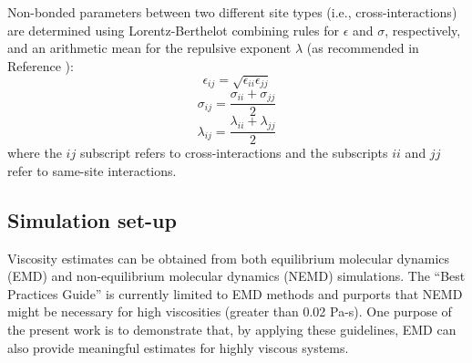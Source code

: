 \documentclass[preprint,review,12pt]{elsarticle}
\begin{document}
	Non-bonded parameters between two different site types (i.e., cross-interactions) are determined using Lorentz-Berthelot combining rules \cite{Allen1987} for $\epsilon$ and $\sigma$, respectively, and an arithmetic mean for the repulsive exponent $\lambda$ (as recommended in Reference ):
	\begin{equation} \label{eq:Lorentz-Berthelot_eps}
	\epsilon_{ij} = \sqrt{\epsilon_{ii} \epsilon_{jj}}
	\end{equation}
	\begin{equation} \label{eq:Lorentz-Berthelot_sig}
	\sigma_{ij} = \frac{\sigma_{ii} + \sigma_{jj}}{2}
	\end{equation}
	\begin{equation} \label{eq:Lorentz-Berthelot_lam}
	\lambda_{ij} = \frac{\lambda_{ii} + \lambda_{jj}}{2}
	\end{equation}
	where the $ij$ subscript refers to cross-interactions and the subscripts $ii$ and $jj$ refer to same-site interactions. 
	
	
	\subsection{Simulation set-up}
	
	
	Viscosity estimates can be obtained from both equilibrium molecular dynamics (EMD) and non-equilibrium molecular dynamics (NEMD) simulations. The ``Best Practices Guide'' is currently limited to EMD methods and purports that NEMD might be necessary for high viscosities (greater than 0.02 Pa-s). One purpose of the present work is to demonstrate that, by applying these guidelines, EMD can also provide meaningful estimates for highly viscous systems. 
	
\end{document}
